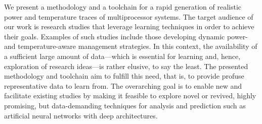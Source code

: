 We present a methodology and a toolchain for a rapid generation of realistic
power and temperature traces of multiprocessor systems. The target audience of
our work is research studies that leverage learning techniques in order to
achieve their goals. Examples of such studies include those developing dynamic
power- and temperature-aware management strategies. In this context, the
availability of a sufficient large amount of data---which is essential for
learning and, hence, exploration of research ideas---is rather elusive, to say
the least. The presented methodology and toolchain aim to fulfill this need,
that is, to provide profuse representative data to learn from. The overarching
goal is to enable new and facilitate existing studies by making it feasible to
explore novel or revived, highly promising, but data-demanding techniques for
analysis and prediction such as artificial neural networks with deep
architectures.
